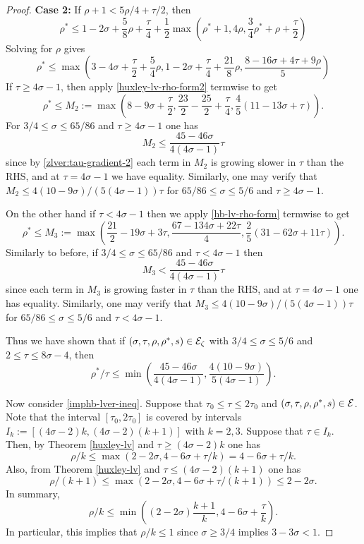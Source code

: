 \begin{proof}
\textbf{Case 2:} If $\rho + 1 < 5\rho/4 + \tau/2$, then  
\[
\rho^* \le 1 - 2\sigma + \frac{5}{8}\rho + \frac{\tau}{4} + \frac{1}{2}\max(\rho^* + 1, 4\rho, \frac{3}{4}\rho^*+\rho +\frac{\tau}{2})
\]
Solving for $\rho$ gives 
\[
\rho^* \le \max(3 - 4\sigma + \frac{\tau}{2} + \frac{5}{4}\rho, 1 - 2\sigma + \frac{\tau}{4} + \frac{21}{8}\rho, \frac{8 - 16\sigma + 4\tau + 9\rho}{5})
\]
If $\tau \ge 4\sigma - 1$, then apply \eqref{huxley-lv-rho-form2} termwise to get 
\[
\rho^* \le M_2 := \max(8 - 9\sigma + \frac{\tau}{2}, \frac{23}{2} - \frac{25}{2} + \frac{\tau}{4}, \frac{4}{5}(11 - 13 \sigma + \tau)).
\]
For $3/4 \le \sigma \le 65/86$ and $\tau \ge 4\sigma - 1$ one has 
\[
M_2 \le \frac{45 - 46\sigma}{4(4\sigma - 1)}\tau
\]
since by \eqref{zlver:tau-gradient-2} each term in $M_2$ is growing slower in $\tau$ than the RHS, and at $\tau = 4\sigma - 1$ we have equality. Similarly, one may verify that $M_2 \le 4(10 - 9\sigma)/(5(4\sigma - 1))\tau$ for $65/86 \le \sigma \le 5/6$ and $\tau \ge 4\sigma - 1$. 

On the other hand if $\tau < 4\sigma - 1$ then we apply \eqref{hb-lv-rho-form} termwise to get 
\[
\rho^* \le M_3 := \max(\frac{21}{2} - 19\sigma + 3\tau, \frac{67 -134\sigma + 22\tau}{4}, \frac{2}{5}(31 - 62\sigma + 11\tau)).
\]
Similarly to before, if $3/4 \le \sigma \le 65/86$ and $\tau < 4\sigma - 1$ then 
\[
M_3 < \frac{45 - 46\sigma}{4(4\sigma - 1)}\tau
\]
since each term in $M_3$ is growing faster in $\tau$ than the RHS, and at $\tau = 4\sigma - 1$ one has equality. Similarly, one may verify that $M_3 \le 4(10 - 9\sigma)/(5(4\sigma - 1))\tau$ for $65/86 \le \sigma \le 5/6$ and $\tau < 4\sigma - 1$. 

Thus we have shown that if $(\sigma, \tau, \rho, \rho^*, s) \in \mathcal{E}_\zeta$ with $3/4 \le \sigma \le 5/6$ and $2 \le \tau \le 8\sigma - 4$, then 
\[
\rho^*/\tau \le \min\left(\frac{45 - 46\sigma}{4(4\sigma - 1)}, \frac{4(10 - 9\sigma)}{5(4\sigma - 1)}\right).
\]

Now consider \eqref{imphb-lver-ineq}. Suppose that $\tau_0 \le \tau \le 2\tau_0$ and $(\sigma, \tau, \rho, \rho^*, s) \in \mathcal{E}$. Note that the interval $[\tau_0, 2\tau_0]$ is covered by intervals $I_k := [(4\sigma - 2)k, (4\sigma - 2)(k + 1)]$ with $k = 2, 3$. Suppose that $\tau \in I_k$. Then, by Theorem \ref{huxley-lv} and $\tau \ge (4\sigma - 2)k$ one has
\[
\rho/k \le \max(2 - 2\sigma, 4 - 6\sigma + \tau/k) = 4 - 6\sigma + \tau/k.
\]
Also, from Theorem \ref{huxley-lv} and $\tau \le (4\sigma - 2)(k + 1)$ one has
\[
\rho/(k + 1) \le \max(2 - 2\sigma, 4 - 6\sigma + \tau/(k + 1)) \le 2 - 2\sigma.
\]
In summary,
\begin{equation}\label{ze-ihb-rho-bound-k}
\rho/k \le \min((2 - 2\sigma)\frac{k + 1}{k}, 4 - 6\sigma + \frac{\tau}{k}).
\end{equation}
In particular, this implies that $\rho/k \le 1$ since $\sigma \ge 3/4$ implies $3 - 3\sigma < 1$.


\end{proof}
